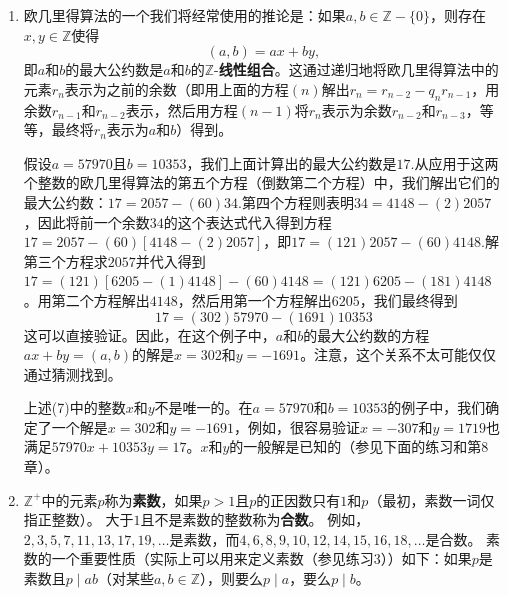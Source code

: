 \begin{enumerate}[label=(\arabic*)]
\begin{example}
假设$a = 57970$且$b = 10353$.应用欧几里得算法我们得到：
\[
\begin{aligned}
57970 &= (5)  10353 + 6205, \\
10353 &= (1)  6205 + 4148, \\
6205 &= (1)  4148 + 2057, \\
4148 &= (2)  2057 + 34, \\
2057 &= (60)  34 + 17, \\
34 &= (2)  17,
\end{aligned}
\]
这表明$(57970, 10353) = 17$.
\end{example}

\item 欧几里得算法的一个我们将经常使用的推论是：如果$a, b \in \mathbb{Z} - \{0\}$，则存在$x, y \in \mathbb{Z}$使得
\[
(a, b) = ax + by,
\]
即$a$和$b$的最大公约数是$a$和$b$的$\mathbb{Z}$-\textbf{线性组合}。这通过递归地将欧几里得算法中的元素$r_n$表示为之前的余数（即用上面的方程$(n)$解出$r_n = r_{n-2} - q_n r_{n-1}$，用余数$r_{n-1}$和$r_{n-2}$表示，然后用方程$(n-1)$将$r_n$表示为余数$r_{n-2}$和$r_{n-3}$，等等，最终将$r_n$表示为$a$和$b$）得到。



\begin{example}
假设$a = 57970$且$b = 10353$，我们上面计算出的最大公约数是$17$.从应用于这两个整数的欧几里得算法的第五个方程（倒数第二个方程）中，我们解出它们的最大公约数：$17 = 2057 - (60)34$.第四个方程则表明$34 = 4148 - (2)2057$，因此将前一个余数$34$的这个表达式代入得到方程$17 = 2057 - (60)[4148 - (2)2057]$，即$17 = (121)2057 - (60)4148$.解第三个方程求$2057$并代入得到$17 = (121)[6205 - (1)4148] - (60)4148 = (121)6205 - (181)4148$。用第二个方程解出$4148$，然后用第一个方程解出$6205$，我们最终得到
\[
17 = (302)57970 - (1691)10353
\]
这可以直接验证。因此，在这个例子中，$a$和$b$的最大公约数的方程$ax + by = (a, b)$的解是$x = 302$和$y = -1691$。注意，这个关系不太可能仅仅通过猜测找到。

上述(7)中的整数$x$和$y$不是唯一的。在$a = 57970$和$b = 10353$的例子中，我们确定了一个解是$x = 302$和$y = -1691$，例如，很容易验证$x = -307$和$y = 1719$也满足$57970x + 10353y = 17$。$x$和$y$的一般解是已知的（参见下面的练习和第8章）。
\end{example}

\item 
$\mathbb{Z}^+$中的元素$p$称为\textbf{素数}，如果$p > 1$且$p$的正因数只有$1$和$p$（最初，素数一词仅指正整数）。
大于$1$且不是素数的整数称为\textbf{合数}。
例如，$2,3,5,7,11,13,17,19,\dots$是素数，而$4,6,8,9,10,12,14,15,16,18,\dots$是合数。
素数的一个重要性质（实际上可以用来定义素数（参见练习3））如下：如果$p$是素数且$p \mid ab$（对某些$a, b \in \mathbb{Z}$），则要么$p \mid a$，要么$p \mid b$。


\end{enumerate}
